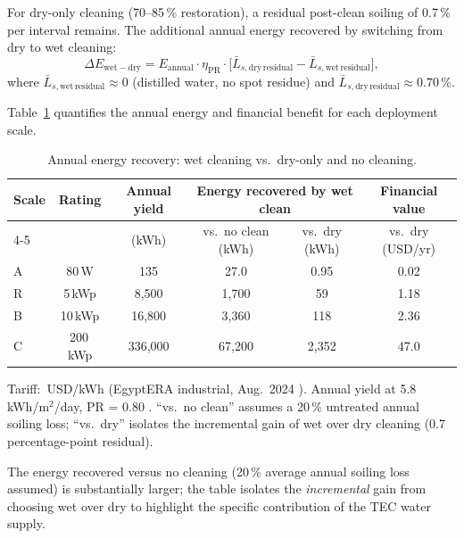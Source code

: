 \documentclass[12pt,a4paper]{report}
\numberwithin{equation}{chapter}
\numberwithin{figure}{chapter}
\numberwithin{table}{chapter}
\begin{document}
For dry-only cleaning (70--85\,\% restoration), a residual post-clean soiling of
0.7\,\% per interval remains. The additional annual energy recovered by switching from
dry to wet cleaning:
\begin{equation}
  \Delta E_\mathrm{wet-dry} = E_\mathrm{annual} \cdot \eta_\mathrm{PR} \cdot
  \bigl[\bar{L}_{s,\mathrm{dry\,residual}} - \bar{L}_{s,\mathrm{wet\,residual}}\bigr],
  \label{eq:6.3}
\end{equation}
where $\bar{L}_{s,\mathrm{wet\,residual}} \approx 0$ (distilled water, no spot residue)
and $\bar{L}_{s,\mathrm{dry\,residual}} \approx 0.70\,\%$.

Table~\ref{tab:energy_recovery} quantifies the annual energy and financial benefit for
each deployment scale.

\begin{table}[H]
\centering
\caption{Annual energy recovery: wet cleaning vs.\ dry-only and no cleaning.}
\label{tab:energy_recovery}
\begin{tabular}{lccccc}
\toprule
\textbf{Scale} & \textbf{Rating} & \textbf{Annual yield} &
\multicolumn{2}{c}{\textbf{Energy recovered by wet clean}} & \textbf{Financial value} \\
\cmidrule(lr){4-5}
& & (kWh) & vs.\ no clean (kWh) & vs.\ dry (kWh) & vs.\ dry (USD/yr) \\
\midrule
A & 80\,W     & 135       & 27.0      & 0.95    & 0.02 \\
R & 5\,kWp    & 8{,}500   & 1{,}700   & 59      & 1.18 \\
B & 10\,kWp   & 16{,}800  & 3{,}360   & 118     & 2.36 \\
C & 200\,kWp  & 336{,}000 & 67{,}200  & 2{,}352 & 47.0 \\
\bottomrule
\end{tabular}
\vspace{0.25em}
\par\noindent\footnotesize Tariff: \TariffUSD\,USD/kWh (EgyptERA industrial, Aug.\ 2024 \cite{egyptera_tariff}). Annual yield at 5.8\,kWh/m$^2$/day, PR = 0.80 \cite{globalsolaratlas}. ``vs.\ no clean'' assumes a 20\,\% untreated annual soiling loss; ``vs.\ dry'' isolates the incremental gain of wet over dry cleaning (0.7 percentage-point residual).\normalsize
\end{table}

\noindent The energy recovered versus no cleaning (20\,\% average annual soiling loss
assumed) is substantially larger; the table isolates the \textit{incremental} gain from
choosing wet over dry to highlight the specific contribution of the TEC water supply.
\end{document}
